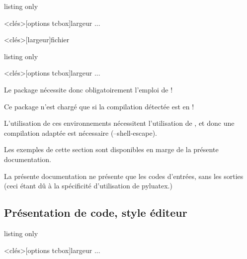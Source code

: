 \begin{PresCodeTexPL}{listing only}
\begin{PitonThonnyEditor}<clés>[options tcbox]{largeur}
...
\end{PitonThonnyEditor}


\PitonThonnyEditorFichier<clés>[largeur]{fichier}
\end{PresCodeTexPL}

\begin{PresCodeTexPL}{listing only}
\begin{PitonThonnyConsole}<clés>[options tcbox]{largeur}
	...
\end{PitonThonnyConsole}
\end{PresCodeTexPL}

\begin{warningblock}
Le package  nécessite donc obligatoirement l’emploi de  !

Ce package n'est chargé que si la compilation détectée est en  !

L'utilisation de ces environnements nécessitent l'utilisation de , et donc une compilation adaptée est nécessaire (\textsf{--shell-escape}).
\end{warningblock}

\begin{cautionblock}
Les exemples de cette section sont disponibles en marge de la présente documentation.

La présente documentation ne présente que les codes d'entrées, sans les sorties (ceci étant dû à la spécificité d'utilisation de \textsf{pyluatex}.)
\end{cautionblock}

\subsection{Présentation de code, style éditeur}

\begin{PresCodeTexPL}{listing only}
\begin{PitonThonnyEditor}<clés>[options tcbox]{largeur}
...
\end{PitonThonnyEditor}
\end{PresCodeTexPL}

